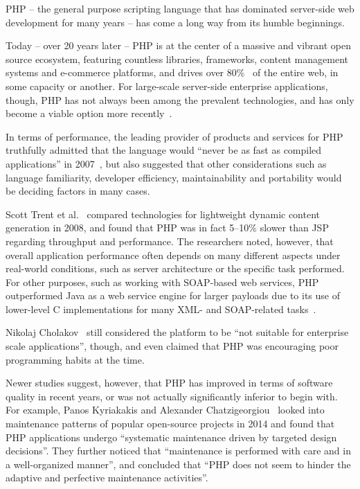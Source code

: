 PHP – the general purpose scripting language that has dominated server-side web development for many years – has come a long way from its humble beginnings.

Today – over 20 years later – PHP is at the center of a massive and vibrant open source ecosystem, featuring countless libraries, frameworks, content management systems and e-commerce platforms, and drives over 80\%~\cite{W3Techs2016} of the entire web, in some capacity or another. For large-scale server-side enterprise applications, though, PHP has not always been among the prevalent technologies, and has only become a viable option more recently~\cite{Zend2007, Bruno2012, Bruno2013}.

In terms of performance, the leading provider of products and services for PHP truthfully admitted that the language would “never be as fast as compiled applications” in 2007~\cite{Zend2007}, but also suggested that other considerations such as language familiarity, developer efficiency, maintainability and portability would be deciding factors in many cases.

Scott Trent et al.~\cite{Trent2008} compared technologies for lightweight dynamic content generation in 2008, and found that PHP was in fact 5–10\% slower than JSP regarding throughput and performance. The researchers noted, however, that overall application performance often depends on many different aspects under real-world conditions, such as server architecture or the specific task performed. For other purposes, such as working with SOAP-based web services, PHP outperformed Java as a web service engine for larger payloads due to its use of lower-level C implementations for many XML- and SOAP-related tasks~\cite{Suzumura2008}.

Nikolaj Cholakov~\cite{Cholakov2008} still considered the platform to be “not suitable for enterprise scale applications”, though, and even claimed that PHP was encouraging poor programming habits at the time.

Newer studies suggest, however, that PHP has improved in terms of software quality in recent years, or was not actually significantly inferior to begin with. For example, Panos Kyriakakis and Alexander Chatzigeorgiou~\cite{Kyriakakis2014} looked into maintenance patterns of popular open-source projects in 2014 and found that PHP applications undergo “systematic maintenance driven by targeted design decisions”. They further noticed that “maintenance is performed with care and in a well-organized manner”, and concluded that “PHP does not seem to hinder the adaptive and perfective maintenance activities”.

